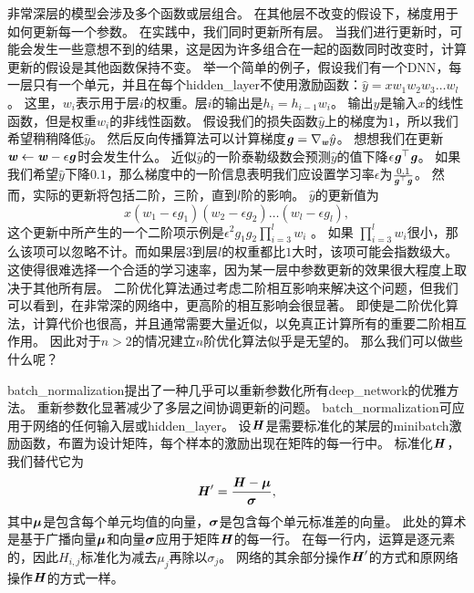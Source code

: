 非常深层的模型会涉及多个函数或层组合。
在其他层不改变的假设下，梯度用于如何更新每一个参数。
在实践中，我们同时更新所有层。
当我们进行更新时，可能会发生一些意想不到的结果，这是因为许多组合在一起的函数同时改变时，计算更新的假设是其他函数保持不变。
举一个简单的例子，假设我们有一个\gls{DNN}，每一层只有一个单元，并且在每个\gls{hidden_layer}不使用激励函数：$\hat{y} = xw_1 w_2 w_3 \dots w_l$。
这里，$w_i$表示用于层$i$的权重。层$i$的输出是$h_i = h_{i-1} w_i$。
输出$\hat{y}$是输入$x$的线性函数，但是权重$w_i$的非线性函数。
假设我们的损失函数$\hat{y}$上的梯度为$1$，所以我们希望稍稍降低$\hat{y}$。
然后反向传播算法可以计算梯度$\boldsymbol{\mathit{g}} = \nabla_{\boldsymbol{\mathit{w}}} \hat{y}$。
想想我们在更新$\boldsymbol{\mathit{w}} \leftarrow \boldsymbol{\mathit{w}} - \epsilon \boldsymbol{\mathit{g}}$时会发生什么。
近似$\hat{y}$的一阶泰勒级数会预测$\hat{y}$的值下降$\epsilon \boldsymbol{\mathit{g}}^\top \boldsymbol{\mathit{g}}$。
如果我们希望$\hat{y}$下降$0.1$，那么梯度中的一阶信息表明我们应设置学习率$\epsilon$为$\frac{0.1}{\boldsymbol{\mathit{g}}^\top \boldsymbol{\mathit{g}}}$。
然而，实际的更新将包括二阶，三阶，直到$l$阶的影响。
$\hat{y}$的更新值为
\begin{equation}
    x(w_1-\epsilon g_1)(w_2-\epsilon g_2)\dots(w_l-\epsilon g_l),
\end{equation}
这个更新中所产生的一个二阶项示例是$\epsilon^2 g_1 g_2 \prod_{i=3}^l w_i$ 。
如果 $\prod_{i=3}^l w_i$很小，那么该项可以忽略不计。而如果层$3$到层$l$的权重都比$1$大时，该项可能会指数级大。
这使得很难选择一个合适的学习速率，因为某一层中参数更新的效果很大程度上取决于其他所有层。
二阶优化算法通过考虑二阶相互影响来解决这个问题，但我们可以看到，在非常深的网络中，更高阶的相互影响会很显著。
即使是二阶优化算法，计算代价也很高，并且通常需要大量近似，以免真正计算所有的重要二阶相互作用。
因此对于$n>2$的情况建立$n$阶优化算法似乎是无望的。
那么我们可以做些什么呢？


\gls{batch_normalization}提出了一种几乎可以重新参数化所有\gls{deep_network}的优雅方法。
重新参数化显著减少了多层之间协调更新的问题。
\gls{batch_normalization}可应用于网络的任何输入层或\gls{hidden_layer}。
设$\boldsymbol{\mathit{H}}$是需要标准化的某层的\gls{minibatch}激励函数，布置为设计矩阵，每个样本的激励出现在矩阵的每一行中。
标准化$\boldsymbol{\mathit{H}}$，我们替代它为
\begin{equation}
\boldsymbol{\mathit{H}}' = \frac{\boldsymbol{\mathit{H}} - \boldsymbol{\mu}}{\boldsymbol{\sigma}},
\end{equation}
其中$\boldsymbol{\mu}$是包含每个单元均值的向量，$\boldsymbol{\sigma}$是包含每个单元标准差的向量。
此处的算术是基于广播向量$\boldsymbol{\mu}$和向量$\boldsymbol{\sigma}$应用于矩阵$\boldsymbol{\mathit{H}}$的每一行。
在每一行内，运算是逐元素的，因此$H_{i,j}$标准化为减去$\mu_j$再除以$\sigma_j$。
网络的其余部分操作$\boldsymbol{\mathit{H}}'$的方式和原网络操作$\boldsymbol{\mathit{H}}$的方式一样。


